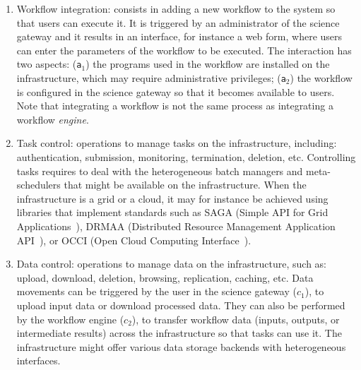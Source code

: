 \documentclass[preprint,3p,twocolumn]{elsarticle}
\newcommand{\closedanswerednote}[6]{}
\begin{document}
\begin{enumerate}[leftmargin=0cm,itemindent=0.65cm,label=\texttt{(\alph*)}]

\item Workflow integration: consists in adding a new workflow to the
  system so that users can execute it. It is triggered by an
  administrator of the science gateway and it results in an interface,
  for instance a web form, where users can enter the parameters of the
  workflow to be executed. The interaction has two aspects:
  (\texttt{a$_1$}) the programs used in the workflow are installed on
  the infrastructure, which may require administrative privileges;
  (\texttt{a$_2$}) the workflow is configured in the science gateway
  so that it becomes available to users. Note that integrating a
  workflow is not the same process as integrating a workflow
  \emph{engine}.
\item Task control: operations to manage tasks on the infrastructure,
  including: authentication, submission, monitoring, termination,
  deletion, etc. Controlling tasks requires to deal with the
  heterogeneous batch managers and meta-schedulers that might be
  available on the infrastructure. When the infrastructure is a grid
  or a cloud, it may for instance be achieved using libraries that
  implement standards such as SAGA (Simple API for Grid
  Applications~\cite{goodale2006saga}), DRMAA (Distributed Resource
  Management Application API~\cite{troger2012distributed}), or OCCI
  (Open Cloud Computing Interface~\cite{edmonds2012toward}).
\item Data control: operations to manage data on the infrastructure,
  such as: upload, download, deletion, browsing, replication, caching,
  etc. Data movements can be triggered by the user in the science
  gateway (\texttt{$c_1$}), to upload input data or download processed
  data. They can also be performed by the workflow engine
  (\texttt{$c_2$}), to transfer workflow data (inputs, outputs, or
  intermediate results) across the infrastructure so that tasks can
  use it. The infrastructure might offer various data storage backends
  with heterogeneous interfaces. \closedanswerednote{Marc-Etienne}{this -c2- can be also trigerred
    by the user}{Tristan}{No, it can't: this is by definition an interaction between the workflow engine and the infrastructure. It is used to transfer data to/from tasks. I reworded a bit, is it clearer now?}
    {Marc-e}{I meant, "using c1", a user in some platforms (CBRAIN), can trigger
    some operations across the infrastructure, as in c2... not just up/download data.
}
\end{enumerate}
\end{document}
